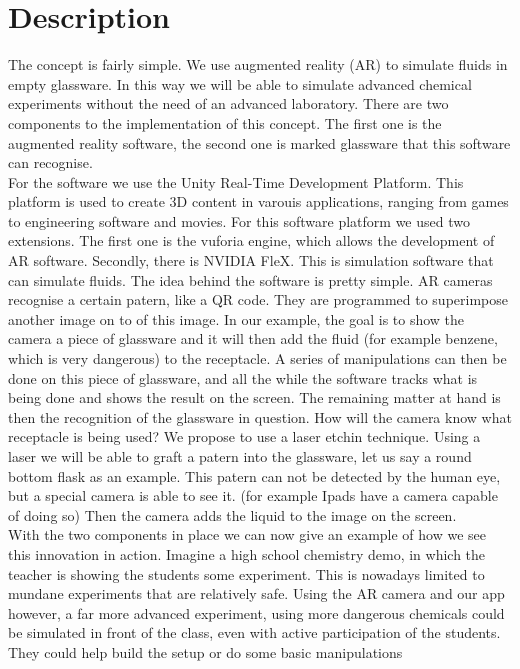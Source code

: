 \documentclass[%
    paper=A4,               %
    twoside=true,           %
    openany,              %
    parskip=full,           %
    chapterprefix=true,     %
    11pt,                   %
    headings=normal,        %
    bibliography=totoc,     %
    listof=totoc,           %
    titlepage=on,           %
    captions=tableabove,    %
    draft=false,            %
]{scrreprt}
\numberwithin{equation}{section}
\begin{document}
    \section{Description}
    \label{sec:descript}
    The concept is fairly simple. We use augmented reality (AR) to simulate fluids in empty glassware. In this way we will be able to simulate advanced chemical experiments without
    the need of an advanced laboratory. There are two components to the implementation of this concept. The first one is the augmented reality software, the second one is marked 
    glassware that this software can recognise. \\
    For the software we use the Unity Real-Time Development Platform. This platform is used to create 3D content in varouis applications, ranging from games to engineering software
    and movies. For this software platform we used two extensions. The first one is the vuforia engine, which allows the development of AR software. Secondly, there is NVIDIA FleX. 
    This is simulation software that can simulate fluids. The idea behind the software is pretty simple. AR cameras recognise a certain patern, like a QR code. They are programmed 
    to superimpose another image on to of this image. In our example, the goal is to show the camera a piece of glassware and it will then add the fluid (for example benzene, which
    is very dangerous) to the receptacle. A series of manipulations can then be done on this piece of glassware, and all the while the software tracks what is being done and shows
    the result on the screen. The remaining matter at hand is then the recognition of the glassware in question. How will the camera know what receptacle is being used? We propose
    to use a laser etchin technique. Using a laser we will be able to graft a patern into the glassware, let us say a round bottom flask as an example. This patern can not be 
    detected by the human eye, but a special camera is able to see it. (for example Ipads have a camera capable of doing so) Then the camera adds the liquid to the image on the 
    screen. \\
    With the two components in place we can now give an example of how we see this innovation in action. Imagine a high school chemistry demo, in which the teacher is showing the 
    students some experiment. This is nowadays limited to mundane experiments that are relatively safe. Using the AR camera and our app however, a far more advanced experiment, using
    more dangerous chemicals could be simulated in front of the class, even with active participation of the students. They could help build the setup or do some basic manipulations
\end{document}
